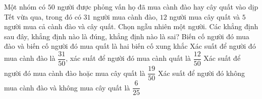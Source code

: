 \begin{ex}%
 Một nhóm có $50$ người được phỏng vấn họ đã mua cành đào hay cây quất vào dịp Tết vừa qua, trong đó có $31$ người mua cành đào, $12$ người mua cây quất và $5$ người mua cả cành đào  và cây quất. Chọn ngẫu nhiên một người. Các khẳng định sau đây, khẳng định nào là đúng, khẳng định nào là sai?
  \choiceTF
   {Biến cố người đó mua đào và biến cố người đó mua quất là hai biến cố xung khắc}
  {\True  Xác suất để người đó mua cành đào là $\dfrac{31}{50}$, xác suất để người đó mua cành quất là $\dfrac{12}{50}$}
  {Xác suất để người đó mua cành đào hoặc mua cây quất là $\dfrac{19}{50}$} 
  {\True Xác suất  để người đó không mua cành đào và không mua cây quất là $\dfrac{6}{25}$}
\end{ex}

